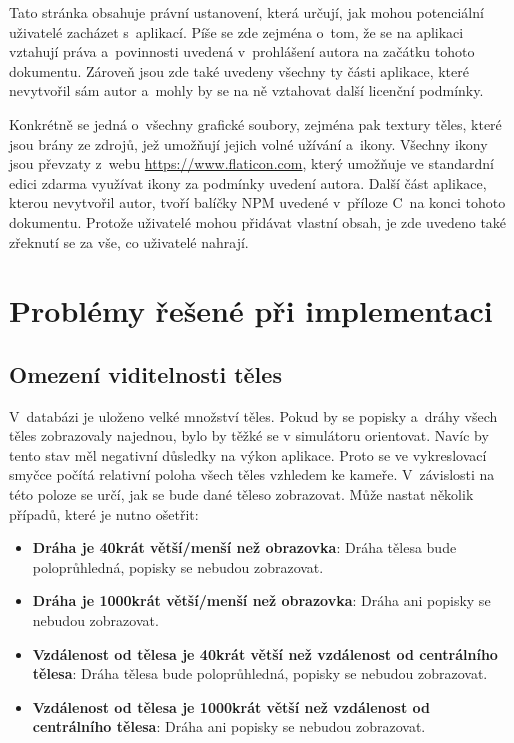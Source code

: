 \documentclass[a4paper,12pt]{article}
\begin{document}
Tato stránka obsahuje právní ustanovení, která určují, jak mohou potenciální uživatelé zacházet s~aplikací. Píše se zde zejména o~tom, že se na aplikaci vztahují práva a~povinnosti uvedená v~prohlášení autora na začátku tohoto dokumentu. Zároveň jsou zde také uvedeny všechny ty části aplikace, které nevytvořil sám autor a~mohly by se na ně vztahovat další licenční podmínky.

Konkrétně se jedná o~všechny grafické soubory, zejména pak textury těles, které jsou brány ze zdrojů, jež umožňují jejich volné užívání a~ikony. Všechny ikony jsou převzaty z~webu \url{https://www.flaticon.com}, který umožňuje ve standardní edici zdarma využívat ikony za podmínky uvedení autora. Další část aplikace, kterou nevytvořil autor, tvoří balíčky NPM uvedené v~příloze C~na konci tohoto dokumentu. Protože uživatelé mohou přidávat vlastní obsah, je zde uvedeno také zřeknutí se za vše, co uživatelé nahrají.

\section{Problémy řešené při implementaci}

\subsection{Omezení viditelnosti těles}

V~databázi je uloženo velké množství těles. Pokud by se popisky a~dráhy všech těles zobrazovaly najednou, bylo by těžké se v simulátoru orientovat. Navíc by tento stav měl negativní důsledky na výkon aplikace. Proto se ve vykreslovací smyčce počítá relativní poloha všech těles vzhledem ke kameře. V~závislosti na této poloze se určí, jak se bude dané těleso zobrazovat. Může nastat několik případů, které je nutno ošetřit:

\begin{itemize}
\item \textbf{Dráha je 40krát větší/menší než obrazovka}: Dráha tělesa bude poloprůhledná, popisky se nebudou zobrazovat.
\item \textbf{Dráha je 1000krát větší/menší než obrazovka}: Dráha ani popisky se nebudou zobrazovat.
\item \textbf{Vzdálenost od tělesa je 40krát větší než vzdálenost od centrálního tělesa}: Dráha tělesa bude poloprůhledná, popisky se nebudou zobrazovat.
\item \textbf{Vzdálenost od tělesa je 1000krát větší než vzdálenost od centrálního tělesa}: Dráha ani popisky se nebudou zobrazovat.
\end{itemize} 
\end{document}
